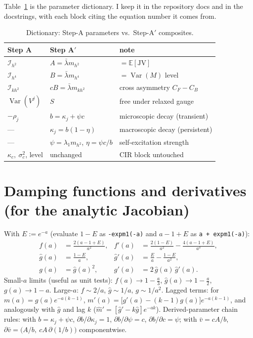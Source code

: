 \documentclass[11pt]{report}
\theoremstyle{definition}
\theoremstyle{remark}
\newcommand{\E}{\mathbb{E}}
\newcommand{\Var}{\operatorname{Var}}
\newcommand{\JV}{\mathrm{JV}}
\newcommand{\mh}{m_{h^{2}}}
\newcommand{\mhh}{m_{h^{4}}}
\newcommand{\mkh}{m_{kh^{2}}}
\begin{document}
Table~\ref{tab:dictionary} is the parameter dictionary. I keep it in the
repository docs and in the docstrings, with each block citing the equation
number it comes from.

\begin{table}[h]
\centering
\caption{Dictionary: Step-A parameters vs.\ Step-A$'$ composites.}
\label{tab:dictionary}
\begin{tabular}{lll}
\toprule
Step A & Step A$'$ & note\\
\midrule
$\mathcal{I}_{h^2}$ & $A=\bar\lambda\mh$ & $=\E[\JV]$\\
$\mathcal{I}_{h^4}$ & $B=\bar\lambda\mhh$ & $=\Var(M)$ level\\
$\mathcal{I}_{kh^2}$ & $cB=\bar\lambda\mkh$ & cross asymmetry $C_F-C_B$\\
$\Var(V^j)$ & $S$ & free under relaxed gauge\\
$-\rho_{j}$ & $b=\kappa_{j}+\psi c$ & microscopic decay (transient)\\
--- & $\kappa_{j}=b(1-\eta)$ & macroscopic decay (persistent)\\
--- & $\psi=\lambda_{1}\mh$, $\eta=\psi c/b$ & self-excitation strength\\
$\kappa_{c},\ \sigma_{c}^{2}$, level & unchanged & CIR block untouched\\
\bottomrule
\end{tabular}
\end{table}

\appendix

\chapter{Damping functions and derivatives (for the analytic Jacobian)}
\label{app:derivatives}

With $E:=e^{-a}$ (evaluate $1-E$ as \texttt{-expm1(-a)} and
$a-1+E$ as \texttt{a + expm1(-a)}):
\begin{align*}
f(a)&=\frac{2(a-1+E)}{a^{2}}, &
f'(a)&=\frac{2(1-E)}{a^{2}}-\frac{4(a-1+E)}{a^{3}},\\
\hat g(a)&=\frac{1-E}{a}, &
\hat g'(a)&=\frac{E}{a}-\frac{1-E}{a^{2}},\\
g(a)&=\hat g(a)^{2}, &
g'(a)&=2\,\hat g(a)\,\hat g'(a) .
\end{align*}
Small-$a$ limits (useful as unit tests): $f(a)\to1-\tfrac{a}{3}$,
$\hat g(a)\to1-\tfrac{a}{2}$, $g(a)\to1-a$. Large-$a$:
$f\sim2/a$, $\hat g\sim1/a$, $g\sim1/a^{2}$. Lagged terms: for
$m(a)=g(a)e^{-a(k-1)}$, $m'(a)=\big[g'(a)-(k-1)g(a)\big]e^{-a(k-1)}$, and
analogously with $\hat g$ and lag $k$ ($\hat m'=[\hat g'-k\hat g]e^{-ak}$).
Derived-parameter chain rules: with $b=\kappa_{j}+\psi c$,
$\partial b/\partial\kappa_{j}=1$, $\partial b/\partial\psi=c$,
$\partial b/\partial c=\psi$; with $\bar v=cA/b$,
$\partial\bar v = \big(A/b,\ cA\,\partial(1/b)\big)$ componentwise.
\end{document}
